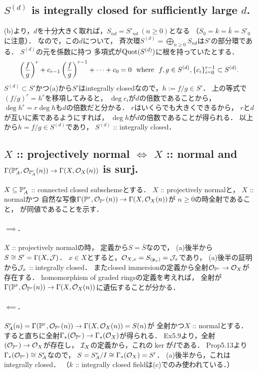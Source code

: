 \documentclass[a4paper]{jsarticle}
\begin{document}
    \subsection{$S^{(d)}$ is integrally closed for sufficiently large $d$.}
    (b)より，$d$を十分大きく取れば，$S_{nd}=S'_{nd} ~(n \geq 0)$となる
    （$S_0=k=\bar{k}=S'_0$に注意）．
    なので，この$d$について，
    斉次環$S^{(d)}=\bigoplus_{n \geq 0} S_{nd}$は$S'$の部分環である．
    $S^{(d)}$の元を係数に持つ
    多項式が$\operatorname{Quot}(S^{(d)})$に根を持っていたとする．
    \[
        \left(\frac{f}{g}\right)^r+c_{r-1}\left(\frac{f}{g}\right)^{r-1}+\dots+c_0=0
        ~~\text{where}~~
        f,g \in S^{(d)}, \{c_i\}_{i=0}^{r-1} \subset S^{(d)}.
    \]
    $S^{(d)} \subset S'$かつ(a)から$S'$はintegrally closedなので，$h:=f/g \in S'$．
    上の等式で$(f/g)^r=h^r$を移項してみると，
    $\deg c_i$が$d$の倍数であることから，
    $\deg h^r=r \deg h$も$d$の倍数だと分かる．
    $r$はいくらでも大きくできるから，
    $r$と$d$が互いに素であるようにすれば，
    $\deg h$が$d$の倍数であることが得られる．
    以上から$h=f/g \in S^{(d)}$であり，
    $S^{(d)}$ :: integrally closed．

    \subsection{$X$ :: projectively normal $\iff$ $X$ :: normal and
        $\Gamma(\mathbb{P}^r_A, \mathcal{O}_{\mathbb{P}^r_A}(n)) \to \Gamma(X,\mathcal{O}_X(n))$ is surj.}

    $X \subseteq \mathbb{P}^r_A$ :: connected closed subschemeとする．
    $X$ :: projectively normalと，
    $X$ :: normalかつ
    自然な写像$\Gamma(\mathbb{P}^r, \mathcal{O}_{\mathbb{P}^r}(n)) \to \Gamma(X,\mathcal{O}_X(n))$が
    $n \geq 0$の時全射であること，
    が同値であることを示す．

    \paragraph{$\implies$.}
    $X$ :: projectively normalの時，
    定義から$S=\bar{S}$なので，
    (a)後半から$S \cong S'=\Gamma(X,\mathcal{J})$．
    $x \in X$とすると，$\mathcal{O}_{X,x}=S_{(\mathfrak{p}_x)}=\mathcal{J}_x$であり，
    (a)後半の証明から$\mathcal{J}_x$ :: integrally closed．
    またclosed immersionの定義から全射$\mathcal{O}_{\mathbb{P}^r} \to \mathcal{O}_{X}$が存在する．
    homomorphism of graded ringsの定義を考えれば，
    全射が$\Gamma(\mathbb{P}^r, \mathcal{O}_{\mathbb{P}^r}(n)) \to \Gamma(X,\mathcal{O}_X(n))$に遺伝することが分かる．

    \paragraph{$\impliedby$.}
    $S_A^r(n)=\Gamma(\mathbb{P}^r, \mathcal{O}_{\mathbb{P}^r}(n)) \to \Gamma(X,\mathcal{O}_X(n))=S(n)$が
    全射かつ$X$ :: normalとする．
    すると直ちに全射$\Gamma_*(\mathcal{O}_{\mathbb{P}^r}) \to \Gamma_*(\mathcal{O}_X)$が得られる．
    Ex5.9より，全射$(\mathcal{O}_{\mathbb{P}^r}) \to \mathcal{O}_X$が存在し，
    $\mathcal{I}_X$の定義から，これの$\ker$が$I$である．
    Prop5.13より$\Gamma_*(\mathcal{O}_{\mathbb{P}^r}) \cong S_A^r$なので，
    $S=S_A^r/I \cong \Gamma_*(\mathcal{O}_X)=S'$．
    (a)後半から，これはintegrally closed．
    （$k$ :: integrally closed fieldは(c)でのみ使われている．）
\end{document}
